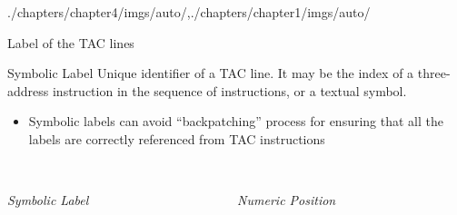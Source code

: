 \begin{graphicspathcontext}{{./chapters/chapter4/imgs/auto/},{./chapters/chapter1/imgs/auto/}}
\begin{bibunit}[apalike]
\begin{frame}[background=6]{Label of the TAC lines}
	\begin{definitionblock}{Symbolic Label}
		Unique identifier of a TAC line. It may be the index of a three-address instruction in the sequence of instructions, or a textual symbol.
	\end{definitionblock}
	\begin{itemize}
	\item Symbolic labels can avoid ``backpatching'' process for ensuring that all the labels are correctly referenced from TAC instructions
	\end{itemize}
	\begin{columns}
		\begin{column}{.4\linewidth}
			\begin{center}
			\begin{tac}[\linewidth]
			\end{tac} \\[1em]
			\emph{Symbolic Label}
			\end{center}
		\end{column}
		\begin{column}{.5\linewidth}
			\begin{center}
			\begin{tac}[\linewidth]
			\end{tac} \\[1em]
			\emph{Numeric Position}
			\end{center}
		\end{column}
	\end{columns}
\end{frame}


\end{bibunit}
\end{graphicspathcontext}
